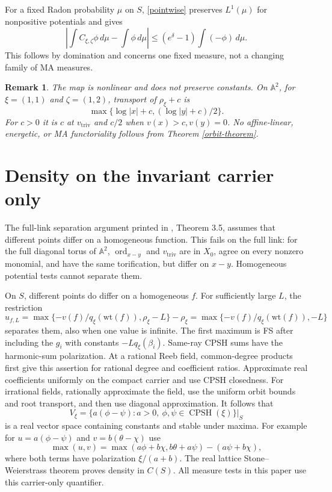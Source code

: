 \documentclass[11pt]{article}
\newtheorem{remark}[theorem]{Remark}
\newcommand{\CPSH}{\operatorname{CPSH}}
\newcommand{\triv}{\mathrm{triv}}
\begin{document}
For a fixed Radon probability $\mu$ on $S$, \eqref{pointwise} preserves $L^1(\mu)$ for nonpositive potentials and gives
\begin{equation}\label{integration}
 \left|\int C_{\xi,\zeta}\phi\,d\mu-\int\phi\,d\mu\right|
 \leq(e^\delta-1)\int(-\phi)\,d\mu.
\end{equation}
This follows by domination and concerns one fixed measure, not a changing family of MA measures.

\begin{remark}
The map is nonlinear and does not preserve constants.
On $\mathbb A^2$, for $\xi=(1,1)$ and $\zeta=(1,2)$, transport of $\rho_\xi+c$ is
\[
 \max\{\log|x|+c,(\log|y|+c)/2\}.
\]
For $c>0$ it is $c$ at $v_\triv$ and $c/2$ when $v(x)>c,v(y)=0$.
No affine-linear, energetic, or MA functoriality follows from Theorem \ref{orbit-theorem}.
\end{remark}

\section{Density on the invariant carrier only}
The full-link separation argument printed in \cite{YW24}, Theorem 3.5, assumes that different points differ on a homogeneous function.
This fails on the full link: for the full diagonal torus of $\mathbb A^2$, $\operatorname{ord}_{x-y}$ and $v_\triv$ are in $X_0$, agree on every nonzero monomial, and have the same torification, but differ on $x-y$.
Homogeneous potential tests cannot separate them.

On $S$, different points do differ on a homogeneous $f$.
For sufficiently large $L$, the restriction
\[
 u_{f,L}=\max\{-v(f)/q_\xi(\mathrm{wt}(f)),\rho_\xi-L\}-\rho_\xi
       =\max\{-v(f)/q_\xi(\mathrm{wt}(f)),-L\}
\]
separates them, also when one value is infinite.
The first maximum is FS after including the $g_i$ with constants $-Lq_\xi(\beta_i)$.
Same-ray CPSH sums have the harmonic-sum polarization. At a rational Reeb field, common-degree products first give this assertion for rational degree and coefficient ratios. Approximate real coefficients uniformly on the compact carrier and use CPSH closedness. For irrational fields, rationally approximate the field, use the uniform orbit bounds and root transport, and then use diagonal approximation.
It follows that
\[
 V_\xi=\{a(\phi-\psi):a>0,\ \phi,\psi\in\CPSH(\xi)\}|_S
\]
is a real vector space containing constants and stable under maxima.
For example for $u=a(\phi-\psi)$ and $v=b(\theta-\chi)$ use
\[
 \max(u,v)=\max(a\phi+b\chi,b\theta+a\psi)-(a\psi+b\chi),
\]
where both terms have polarization $\xi/(a+b)$.
The real lattice Stone--Weierstrass theorem proves density in $C(S)$.
All measure tests in this paper use this carrier-only quantifier.
\end{document}
